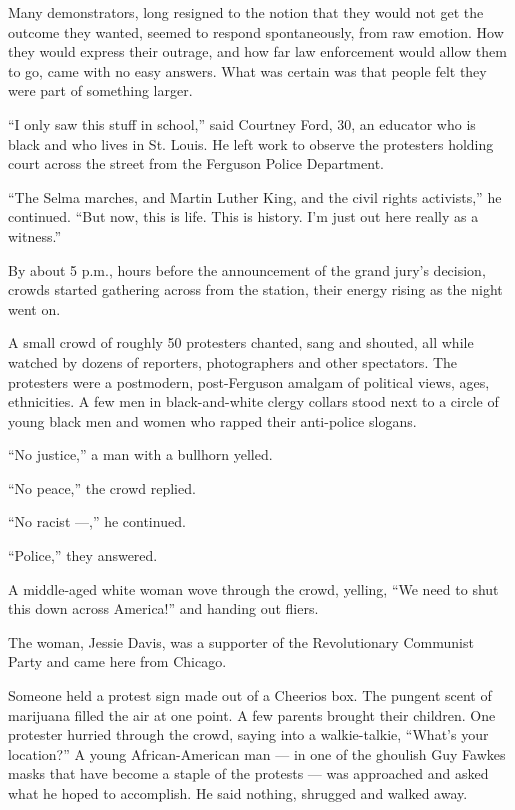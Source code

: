 Many demonstrators, long resigned to the notion that they would not get
the outcome they wanted, seemed to respond spontaneously, from raw
emotion. How they would express their outrage, and how far law
enforcement would allow them to go, came with no easy answers. What was
certain was that people felt they were part of something larger.

``I only saw this stuff in school,'' said Courtney Ford, 30, an educator
who is black and who lives in St. Louis. He left work to observe the
protesters holding court across the street from the Ferguson Police
Department.

``The Selma marches, and Martin Luther King, and the civil rights
activists,'' he continued. ``But now, this is life. This is history. I'm
just out here really as a witness.''

By about 5 p.m., hours before the announcement of the grand jury's
decision, crowds started gathering across from the station, their energy
rising as the night went on.

A small crowd of roughly 50 protesters chanted, sang and shouted, all
while watched by dozens of reporters, photographers and other
spectators. The protesters were a postmodern, post-Ferguson amalgam of
political views, ages, ethnicities. A few men in black-and-white clergy
collars stood next to a circle of young black men and women who rapped
their anti-police slogans.

``No justice,'' a man with a bullhorn yelled.

``No peace,'' the crowd replied.

``No racist ---,'' he continued.

``Police,'' they answered.

A middle-aged white woman wove through the crowd, yelling, ``We need to
shut this down across America!'' and handing out fliers.

The woman, Jessie Davis, was a supporter of the Revolutionary Communist
Party and came here from Chicago.

Someone held a protest sign made out of a Cheerios box. The pungent
scent of marijuana filled the air at one point. A few parents brought
their children. One protester hurried through the crowd, saying into a
walkie-talkie, ``What's your location?'' A young African-American man
--- in one of the ghoulish Guy Fawkes masks that have become a staple of
the protests --- was approached and asked what he hoped to accomplish.
He said nothing, shrugged and walked away.

